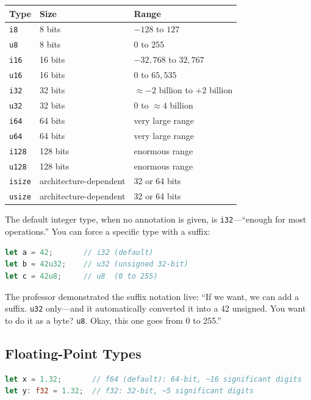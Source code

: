 \begin{center}
\begin{tabular}{|l|l|l|}
\hline
\textbf{Type} & \textbf{Size} & \textbf{Range} \\
\hline
\texttt{i8} & 8 bits & $-128$ to $127$ \\
\texttt{u8} & 8 bits & $0$ to $255$ \\
\texttt{i16} & 16 bits & $-32{,}768$ to $32{,}767$ \\
\texttt{u16} & 16 bits & $0$ to $65{,}535$ \\
\texttt{i32} & 32 bits & $\approx -2$ billion to $+2$ billion \\
\texttt{u32} & 32 bits & $0$ to $\approx 4$ billion \\
\texttt{i64} & 64 bits & very large range \\
\texttt{u64} & 64 bits & very large range \\
\texttt{i128} & 128 bits & enormous range \\
\texttt{u128} & 128 bits & enormous range \\
\texttt{isize} & architecture-dependent & 32 or 64 bits \\
\texttt{usize} & architecture-dependent & 32 or 64 bits \\
\hline
\end{tabular}
\end{center}

The default integer type, when no annotation is given, is \texttt{i32}---``enough for most operations.'' You can force a specific type with a suffix:

\begin{lstlisting}[language=Rust]
let a = 42;       // i32 (default)
let b = 42u32;    // u32 (unsigned 32-bit)
let c = 42u8;     // u8  (0 to 255)
\end{lstlisting}

The professor demonstrated the suffix notation live: ``If we want, we can add a suffix. \texttt{u32} only---and it automatically converted it into a 42 unsigned. You want to do it as a byte? \texttt{u8}. Okay, this one goes from 0 to 255.''

\subsection{Floating-Point Types}

\begin{lstlisting}[language=Rust]
let x = 1.32;       // f64 (default): 64-bit, ~16 significant digits
let y: f32 = 1.32;  // f32: 32-bit, ~5 significant digits
\end{lstlisting}

